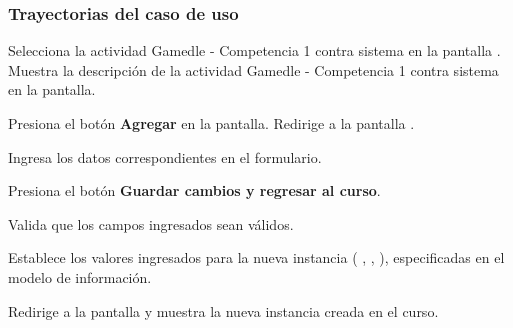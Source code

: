 \begin{UseCase}








\end{UseCase}

\subsubsection{Trayectorias del caso de uso}

\begin{UCtrayectoria}%
%
    \Actor Selecciona la actividad Gamedle - Competencia 1 contra sistema en la pantalla .
    \Sistema Muestra la descripción de la actividad Gamedle - Competencia 1 contra sistema en la pantalla.

    \Actor Presiona el botón {\bf Agregar} en la pantalla. 
    \Sistema Redirige a la pantalla .
    \label{CU-C04-muestra-pantalla}

    \Actor Ingresa los datos correspondientes en el formulario.

    \Actor Presiona el botón {\bf Guardar cambios y regresar al curso}. 

    \Sistema Valida que los campos ingresados sean válidos.  

    \Sistema Establece los valores ingresados para la nueva instancia  (
      ,
      ,
      ), especificadas en el modelo de información.

    \Sistema Redirige a la pantalla  y muestra la nueva instancia creada en el curso.

\end{UCtrayectoria}

